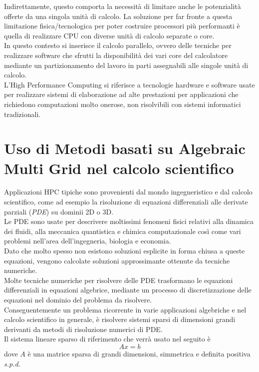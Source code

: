 Indirettamente, questo comporta la necessità di limitare anche le potenzialità offerte da 
una singola unità di calcolo.
\voidLine
La soluzione per far fronte a questa limitazione fisica/tecnologica per poter
costruire processori più performanti è quella di realizzare CPU con diverse unità di calcolo separate o core.\\
In questo contesto si inserisce il calcolo parallelo, ovvero delle tecniche per realizzare software che 
sfrutti la disponibilità dei vari core del calcolatore mediante un partizionamento del lavoro in parti
assegnabili alle singole unità di calcolo.\\
L'High Performance Computing si riferisce a tecnologie hardware e software 
usate per realizzare sistemi di elaborazione ad alte prestazioni 
per applicazioni che richiedono computazioni molto onerose, non risolvibili con sistemi informatici tradizionali.\\

\section{Uso di Metodi basati su Algebraic Multi Grid nel calcolo scientifico} \label{chIntro:PDE_intro}
Applicazioni HPC tipiche sono provenienti dal mondo ingegneristico e dal calcolo scientifico,
come ad esempio la risoluzione di equazioni differenziali alle derivate parziali (\emph{PDE}) su dominii 2D o 3D.\\
Le PDE sono usate per descrivere moltissimi fenomeni fisici relativi alla
dinamica dei fluidi, alla meccanica quantistica e chimica computazionale %
così come vari problemi nell'area dell'ingegneria, biologia e economia.\\
Dato che molto spesso non esistono soluzioni esplicite in forma chiusa a queste equazioni,
vengono calcolate soluzioni approssimante ottenute da tecniche numeriche.\\
Molte tecniche numeriche per risolvere delle PDE trasformano le equazioni differenziali
in equazioni algebrice, mediante un processo di discretizzazione delle equazioni nel dominio del problema da risolvere.\\
Conseguentemente un problema ricorrente in varie applicazioni algebriche e nel calcolo scientifico in generale, 
è risolvere sistemi sparsi di dimensioni grandi derivanti da metodi di risoluzione numerici di PDE.\\
\voidLine
Il sistema lineare sparso di riferimento che verrà usato nel seguito è 
\begin{equation} \label{eq:1}
Ax=b
\end{equation}
dove $A$ è una matrice sparsa di grandi dimensioni,
simmetrica e definita positiva \emph{s.p.d.}\\

